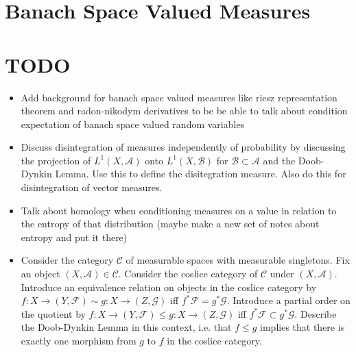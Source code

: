 \documentclass[12pt]{amsart}
\theoremstyle{definition}
\newcommand{\MA}{\mathcal{A}}
\newcommand{\MC}{\mathcal{C}}
\newcommand{\MB}{\mathcal{B}}
\newcommand{\MF}{\mathcal{F}}
\newcommand{\MG}{\mathcal{G}}
\begin{document}
	
	
	
	
	
	
	\newpage
	\section{Banach Space Valued Measures}
	

























	\newpage
	\section{TODO}
	\begin{itemize}
		\item Add background for banach space valued measures like riesz representation theorem and radon-nikodym derivatives to be be able to talk about condition expectation of banach space valued random variables
		\item Discuss disintegration of measures independently of probability by discussing the projection of $L^1(X, \MA)$ onto $L^1(X, \MB)$ for $\MB \subset \MA$ and the Doob-Dynkin Lemma. Use this to define the disitegration measure. Also do this for disintegration of vector measures.
		\item Talk about homology when conditioning measures on a value in relation to the entropy of that distribution (maybe make a new set of notes about entropy and put it there)
		\item Consider the category $\MC$ of measurable spaces with measurable singletons. Fix an object $(X, \MA) \in \MC$. Consider the coslice category of $\MC$ under $(X, \MA)$. Introduce an equivalence relation on objects in the coslice category by $f:X \rightarrow (Y, \MF) \sim g: X \rightarrow (Z, \MG)$ iff $f^*\MF = g^*\MG$. Introduce a partial order on the quotient by $f:X \rightarrow (Y, \MF) \leq g: X \rightarrow (Z, \MG)$ iff $f^*\MF \subset g^*\MG$.  Describe the Doob-Dynkin Lemma in this context, i.e. that $f \leq g$ implies that there is exactly one morphism from $g$ to $f$ in the coslice category.
	\end{itemize}
\end{document}
